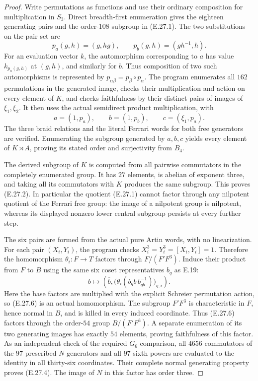 \begin{proof}
Write permutations as functions and use their ordinary composition
for multiplication in $S_3$. Direct breadth-first enumeration gives
the eighteen generating pairs and the order-$108$ subgroup in
(E.27.1). The two substitutions on the pair set are
\[
 p_a(g,h)=(g,hg),\qquad p_b(g,h)=(gh^{-1},h).
 \tag{E.27.5}
\]
For an evaluation vector $k$, the automorphism corresponding to $a$
has value $k_{p_a(g,h)}$ at $(g,h)$, and similarly for $b$.
Thus composition of two such automorphisms is represented by
$p_{\alpha\beta}=p_\beta\circ p_\alpha$. The program enumerates
all $162$ permutations in the generated image, checks their
multiplication and action on every element of $K$, and checks
faithfulness by their distinct pairs of images of $\xi_1,\xi_2$.
It then uses the actual semidirect product multiplication, with
\[
 a=(1,p_a),\qquad b=(1,p_b),\qquad c=(\xi_1,p_a).
\]
The three braid relations and the literal Ferrari words for both
free generators are verified. Enumerating the subgroup generated
by $a,b,c$ yields every element of $K\rtimes A$, proving its stated
order and surjectivity from $B_4$.

The derived subgroup of $K$ is computed from all pairwise
commutators in the completely enumerated group. It has $27$
elements, is abelian of exponent three, and taking all its
commutators with $K$ produces the same subgroup. This proves
(E.27.2). In particular the quotient (E.27.1) cannot factor through
any nilpotent quotient of the Ferrari free group: the image of a
nilpotent group is nilpotent, whereas its displayed nonzero lower
central subgroup persists at every further step.

The six pairs are formed from the actual pure Artin words, with no
linearization. For each pair $(X_i,Y_i)$, the program checks
$X_i^3=Y_i^3=[X_i,Y_i]=1$. Therefore the homomorphism
$\theta_i:F\to T$ factors through $F/(F'F^3)$.
Induce their product from $F$ to $B$ using the same six coset
representatives $b_q$ as E.19:
\[
 b\longmapsto
 \left(\overline b,
 \bigl(\theta_i(b_qb\,b_{q\overline b}^{-1})\bigr)_{q,i}\right).
 \tag{E.27.6}
\]
Here the base factors are multiplied with the explicit Schreier
permutation action, so (E.27.6) is an actual homomorphism.
The subgroup $F'F^3$ is characteristic in $F$, hence normal in $B$,
and is killed in every induced coordinate. Thus (E.27.6) factors
through the order-$54$ group $B/(F'F^3)$. A separate enumeration of
its two generating images has exactly $54$ elements, proving
faithfulness of this factor. As an independent check of the required
$G_6$ comparison, all $4656$ commutators of the $97$ prescribed
$N$ generators and all $97$ sixth powers are evaluated to the
identity in all thirty-six coordinates. Their complete normal
generating property proves (E.27.4). The image of $N$ in this
factor has order three.


\end{proof}
